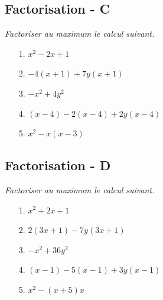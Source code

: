 \documentclass[paper=a4, fontsize=9pt]{scrartcl} %
\begin{document}
\vspace{1cm}

\begin{multicols}{2}

  \subsection*{Factorisation - C}
  \textit{Factoriser au maximum le calcul suivant.}

  \begin{enumerate}
  \item[1.] $x^2 -2x + 1$
  \item[2.] $-4(x+1) + 7y(x+1)$
  \item[3.] $-x^2 + 4y^2$
  \item[4.] $(x - 4) - 2(x - 4) + 2y(x - 4)$
  \item[5.] $x^2 - x(x - 3)$
  \end{enumerate}

  \subsection*{Factorisation - D}
  \textit{Factoriser au maximum le calcul suivant.}

  \begin{enumerate}
  \item[1.] $x^2 + 2x + 1$
  \item[2.] $2(3x + 1) - 7y(3x + 1)$
  \item[3.] $-x^2 + 36y^2$
  \item[4.] $(x - 1) - 5(x - 1) + 3y(x - 1)$
  \item[5.] $x^2 - (x + 5)x$
  \end{enumerate}

\end{multicols}

\vspace{1cm}
\end{document}
